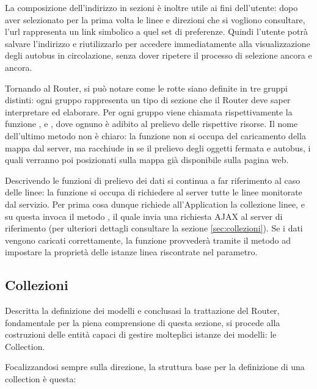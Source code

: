 La composizione dell'indirizzo in sezioni è inoltre utile ai fini dell'utente: dopo aver selezionato per la prima volta le linee e direzioni che si vogliono consultare, l'url rappresenta un link simbolico a quel set di preferenze. Quindi l'utente potrà salvare l'indirizzo e riutilizzarlo per accedere immediatamente alla visualizzazione degli autobus in circolazione, senza dover ripetere il processo di selezione ancora e ancora.

\vspace{1cm}

Tornando al Router, si può notare come le rotte siano definite in tre gruppi distinti: ogni gruppo rappresenta un tipo di sezione che il Router deve saper interpretare ed elaborare. Per ogni gruppo viene chiamata rispettivamente la funzione ,  e , dove ognuno è adibito al prelievo delle rispettive risorse. Il nome dell'ultimo metodo non è chiaro: la funzione non si occupa del caricamento della mappa dal server, ma racchiude in se il prelievo degli oggetti fermata e autobus, i quali verranno poi posizionati sulla mappa già disponibile sulla pagina web.

Descrivendo le funzioni di prelievo dei dati si continua a far riferimento al caso delle linee: la funzione  si occupa di richiedere al server tutte le linee monitorate dal servizio. Per prima cosa dunque richiede all'Application la collezione linee, e su questa invoca il metodo , il quale invia una richiesta AJAX al server di riferimento (per ulteriori dettagli consultare la sezione \ref{sec:collezioni}). Se i dati vengono caricati correttamente, la funzione provvederà tramite il metodo  ad impostare la proprietà  delle istanze linea riscontrate nel parametro.

\subsection{Collezioni} %
\label{sub:collezioni}

Descritta la definizione dei modelli e conclusasi la trattazione del Router, fondamentale per la piena comprensione di questa sezione, si procede alla costruzioni delle entità capaci di gestire molteplici istanze dei modelli: le Collection.

Focalizzandosi sempre sulla direzione, la struttura base per la definizione di una collection è questa:

